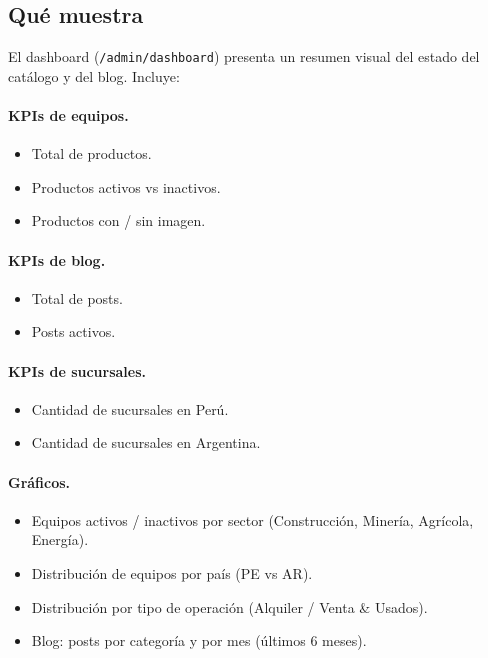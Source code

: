 \documentclass[11pt,a4paper]{article}
\begin{document}
\subsection{Qué muestra}

El dashboard (\texttt{/admin/dashboard}) presenta un resumen visual del
estado del catálogo y del blog. Incluye:

\paragraph{KPIs de equipos.}
\begin{itemize}[leftmargin=*]
    \item Total de productos.
    \item Productos activos vs inactivos.
    \item Productos con / sin imagen.
\end{itemize}

\paragraph{KPIs de blog.}
\begin{itemize}[leftmargin=*]
    \item Total de posts.
    \item Posts activos.
\end{itemize}

\paragraph{KPIs de sucursales.}
\begin{itemize}[leftmargin=*]
    \item Cantidad de sucursales en Perú.
    \item Cantidad de sucursales en Argentina.
\end{itemize}

\paragraph{Gráficos.}
\begin{itemize}[leftmargin=*]
    \item Equipos activos / inactivos por sector (Construcción, Minería,
        Agrícola, Energía).
    \item Distribución de equipos por país (PE vs AR).
    \item Distribución por tipo de operación (Alquiler / Venta \& Usados).
    \item Blog: posts por categoría y por mes (últimos 6 meses).
\end{itemize}
\end{document}
